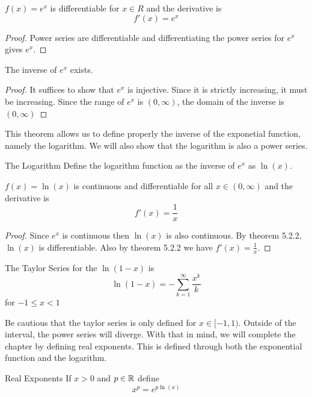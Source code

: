 \documentclass[a4paper]{article}
\begin{document}
\begin{thm}{}{} $f(x)=e^x$ is differentiable for $x\in R$ and the derivative is $$f'(x)=e^x$$ \tcbline
\begin{proof} Power series are differentiable and differentiating the power series for $e^x$ gives $e^x$. 
\end{proof}
\end{thm}

\begin{thm}{}{} The inverse of $e^x$ exists. \tcbline
\begin{proof} It suffices to show that $e^x$ is injective. Since it is strictly increasing, it must be increasing. Since the range of $e^x$ is $(0,\infty)$, the domain of the inverse is $(0,\infty)$
\end{proof}
\end{thm}

This theorem allows us to define properly the inverse of the exponetial function, namely the logarithm. We will also show that the logarithm is also a power series. 

\begin{defn}{The Logarithm}{} Define the logarithm function as the inverse of $e^x$ as $\ln(x)$. 
\end{defn}

\begin{thm}{}{} $f(x)=\ln(x)$ is continuous and differentiable for all $x\in(0,\infty)$ and the derivative is $$f'(x)=\frac{1}{x}$$ \tcbline
\begin{proof} Since $e^x$ is continuous then $\ln(x)$ is also continuous. By theorem 5.2.2, $\ln(x)$ is differentiable. Also by theorem 5.2.2 we have $f'(x)=\frac{1}{x}$. 
\end{proof}
\end{thm}

\begin{thm}{}{} The Taylor Series for the $\ln(1-x)$ is $$\ln(1-x)=-\sum_{k=1}^\infty\frac{x^k}{k}$$ for $-1\leq x<1$
\end{thm}

Be cautious that the taylor series is only defined for $x\in[-1,1)$. Outside of the interval, the power series will diverge. With that in mind, we will complete the chapter by defining real exponents. This is defined through both the exponential function and the logarithm. 

\begin{defn}{Real Exponents}{} If $x>0$ and $p\in\mathbb{R}$ define $$x^p=e^{p\ln(x)}$$
\end{defn}
\end{document}
